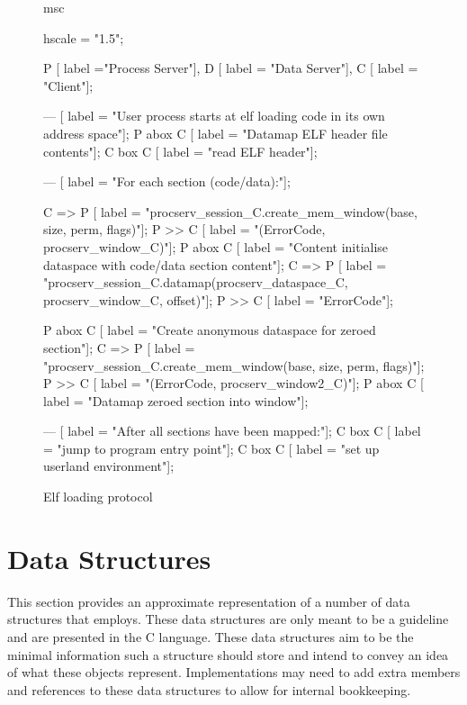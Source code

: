 \begin{figure}[htb]
  \begin{center}
    \begin{msc}
      msc {
        hscale = "1.5";
        
        P [ label ="Process Server"],
        D [ label = "Data Server"],
        C [ label = "Client"];
        
        --- [ label = "User process starts at elf loading code in its own address space"];
        P abox C [ label = "Datamap ELF header file contents"];
        C box C [ label = "read ELF header"];

        --- [ label = "For each section (code/data):"];
        
        C => P [ label = "procserv\_session\_C.create\_mem\_window(base, size, perm, flags)"];
        P >> C [ label = "(ErrorCode, procserv\_window\_C)"];
        P abox C [ label = "Content initialise dataspace with code/data section content"];
        C => P [ label = "procserv\_session\_C.datamap(procserv\_dataspace\_C, procserv\_window\_C, offset)"];
        P >> C [ label = "ErrorCode"];

        P abox C [ label = "Create anonymous dataspace for zeroed section"];
        C => P [ label = "procserv\_session\_C.create\_mem\_window(base, size, perm, flags)"];
        P >> C [ label = "(ErrorCode, procserv\_window2\_C)"];
        P abox C [ label = "Datamap zeroed section into window"];

        --- [ label = "After all sections have been mapped:"];
        C box C [ label = "jump to program entry point"];
        C box C [ label = "set up userland environment"];
      }
    \end{msc}
  \end{center}
  \caption{Elf loading protocol}
  \label{f:elfloading}
\end{figure}

\clearpage
\section{Data Structures}

This section provides an approximate representation of a number of data structures that  employs. These data structures are only meant to be a guideline and are presented in the C language. These data structures aim to be the minimal information such a structure should store and intend to convey an idea of what these objects represent. Implementations may need to add extra members and references to these data structures to allow for internal bookkeeping.

